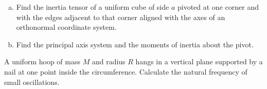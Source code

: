 \documentclass[12pt]{article}
\newenvironment{problem}[2][Problem]{\begin{trivlist}
\item[\hskip \labelsep {\bfseries #1}\hskip \labelsep {\bfseries #2.}]}{\end{trivlist}}
\begin{document}
\begin{problem}{3}
\begin{enumerate}[(a)]
\item Find the inertia tensor of a uniform cube of side $a$ pivoted at one corner and with the edges adjacent to that corner aligned with the axes of an orthonormal coordinate system.
\item Find the principal axis system and the moments of inertia about the pivot.
\end{enumerate}

\end{problem}
\begin{problem}{4}
A uniform hoop of mass $M$ and radius $R$ hangs in a vertical plane supported by a nail at one point inside the circumference. Calculate the natural frequency of small oscillations. 
\begin{center}
\end{center}

\end{problem}


 
\end{document}
